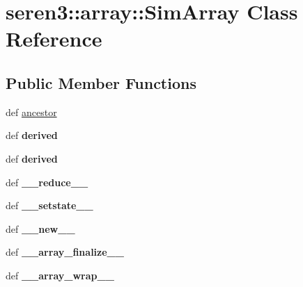 \hypertarget{classseren3_1_1array_1_1SimArray}{
\section{seren3::array::SimArray Class Reference}
\label{classseren3_1_1array_1_1SimArray}
}
\subsection*{Public Member Functions}
\begin{DoxyCompactItemize}
\item 
def \hyperlink{classseren3_1_1array_1_1SimArray_ada3734a91a99489e80b54506a7260895}{ancestor}
\item 
\hypertarget{classseren3_1_1array_1_1SimArray_af728d1165155f43bfa0178ae657956af}{
def {\bfseries derived}}
\label{classseren3_1_1array_1_1SimArray_af728d1165155f43bfa0178ae657956af}

\item 
\hypertarget{classseren3_1_1array_1_1SimArray_af728d1165155f43bfa0178ae657956af}{
def {\bfseries derived}}
\label{classseren3_1_1array_1_1SimArray_af728d1165155f43bfa0178ae657956af}

\item 
\hypertarget{classseren3_1_1array_1_1SimArray_a142a8eda48c534d6163db3ea90f11923}{
def {\bfseries \_\-\_\-reduce\_\-\_\-}}
\label{classseren3_1_1array_1_1SimArray_a142a8eda48c534d6163db3ea90f11923}

\item 
\hypertarget{classseren3_1_1array_1_1SimArray_af02b371abde5f78905f2773e940e2209}{
def {\bfseries \_\-\_\-setstate\_\-\_\-}}
\label{classseren3_1_1array_1_1SimArray_af02b371abde5f78905f2773e940e2209}

\item 
\hypertarget{classseren3_1_1array_1_1SimArray_a66dd23c1474f6cc5cd3aba2f89ac920a}{
def {\bfseries \_\-\_\-new\_\-\_\-}}
\label{classseren3_1_1array_1_1SimArray_a66dd23c1474f6cc5cd3aba2f89ac920a}

\item 
\hypertarget{classseren3_1_1array_1_1SimArray_af0d1402c47d6374bfcdaf7e1fb051c4f}{
def {\bfseries \_\-\_\-array\_\-finalize\_\-\_\-}}
\label{classseren3_1_1array_1_1SimArray_af0d1402c47d6374bfcdaf7e1fb051c4f}

\item 
\hypertarget{classseren3_1_1array_1_1SimArray_aef024ef67240dd8e82f37b74661b00e5}{
def {\bfseries \_\-\_\-array\_\-wrap\_\-\_\-}}
\label{classseren3_1_1array_1_1SimArray_aef024ef67240dd8e82f37b74661b00e5}


\end{DoxyCompactItemize}

